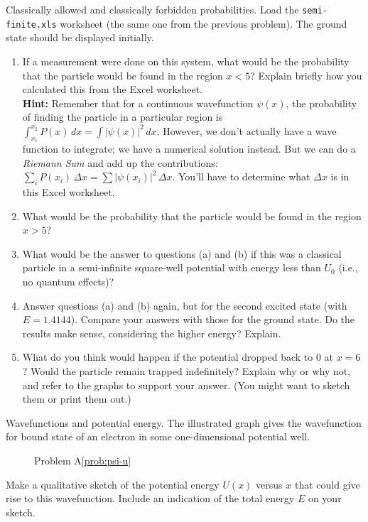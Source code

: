 \begin{aproblem}{Classically allowed and classically forbid\-den
probabilities.}  
  Load the \verb+semi-finite.xls+ worksheet (the same one from the
  previous problem).  The ground state should be displayed initially.
  \begin{enumerate}
  \item If a measurement were done on this system, what would be the
    probability that the particle would be found in the region $x <
    5$?  Explain briefly how you calculated this from the Excel
    worksheet. \\ {\bf Hint:} Remember that for a continuous
    wavefunction $\psi(x)$, the probability of finding the particle in
    a particular region is\\ $\int_{x_1}^{x_2} P(x)\, dx = \int |\psi
    (x)|^2\, dx$.  However, we don't actually have a wave function to
    integrate; we have a numerical solution instead.  But we can do a
    {\it Riemann Sum} and add up the contributions: $\sum_i P(x_i)\,
    \Delta x = \sum |\psi(x_i)|^2\, \Delta x$. You'll have to
    determine what $\Delta x$ is in this Excel worksheet.
  \item What would be the probability that the particle would be found
    in the region $x > 5$?
  \item What would be the answer to questions (a) and (b) if this was
    a classical particle in a semi-infinite square-well potential with
    energy less than $U_0$ (i.e., no quantum effects)?
  \item Answer questions (a) and (b) again, but for the second excited
    state (with $E = 1.4144$).  Compare your answers with those for
    the ground state.  Do the results make sense, considering the
    higher energy? Explain.
  \item What do you think would happen if the potential dropped back
    to 0 at $x=6$?  Would the particle remain trapped indefinitely?
    Explain why or why not, and refer to the graphs to support your
    answer.  (You might want to sketch them or print them out.)
  \end{enumerate}
\end{aproblem}

\newpage

\begin{aproblem}{Wavefunctions and potential energy.} 
  The illustrated graph gives the wavefunction for bound state of an
  electron in some one-dimensional potential well.

  \begin{figure}[h]
    \begin{center}
      \caption{Problem A\ref{prob:psi-u}}
    \end{center}
  \end{figure}

  Make a qualitative sketch of the potential energy $U(x)$ versus $x$
  that could give rise to this wavefunction.  Include an indication of
  the total energy $E$ on your sketch.
  \label{prob:psi-u}
\end{aproblem}
    

